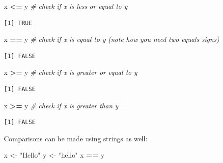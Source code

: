 \documentclass[
]{book}
\newenvironment{Shaded}{\begin{snugshade}}{\end{snugshade}}
\newcommand{\CommentTok}[1]{\textcolor[rgb]{0.56,0.35,0.01}{\textit{#1}}}
\newcommand{\NormalTok}[1]{#1}
\newcommand{\OperatorTok}[1]{\textcolor[rgb]{0.81,0.36,0.00}{\textbf{#1}}}
\newcommand{\StringTok}[1]{\textcolor[rgb]{0.31,0.60,0.02}{#1}}
\begin{document}
\begin{Shaded}
\begin{Highlighting}[]
\NormalTok{x }\OperatorTok{<=}\StringTok{ }\NormalTok{y  }\CommentTok{# check if x is less or equal to y}
\end{Highlighting}
\end{Shaded}

\begin{verbatim}
[1] TRUE
\end{verbatim}

\begin{Shaded}
\begin{Highlighting}[]
\NormalTok{x }\OperatorTok{==}\StringTok{ }\NormalTok{y  }\CommentTok{# check if x is equal to y (note how you need two equals signs)}
\end{Highlighting}
\end{Shaded}

\begin{verbatim}
[1] FALSE
\end{verbatim}

\begin{Shaded}
\begin{Highlighting}[]
\NormalTok{x }\OperatorTok{>=}\StringTok{ }\NormalTok{y  }\CommentTok{# check if x is greater or equal to y }
\end{Highlighting}
\end{Shaded}

\begin{verbatim}
[1] FALSE
\end{verbatim}

\begin{Shaded}
\begin{Highlighting}[]
\NormalTok{x }\OperatorTok{>=}\StringTok{ }\NormalTok{y  }\CommentTok{# check if x is greater than y }
\end{Highlighting}
\end{Shaded}

\begin{verbatim}
[1] FALSE
\end{verbatim}

Comparisons can be made using strings as well:

\begin{Shaded}
\begin{Highlighting}[]
\NormalTok{x <-}\StringTok{ "Hello"}
\NormalTok{y <-}\StringTok{ "hello"}
\NormalTok{x }\OperatorTok{==}\StringTok{ }\NormalTok{y}
\end{Highlighting}
\end{Shaded}
\end{document}

